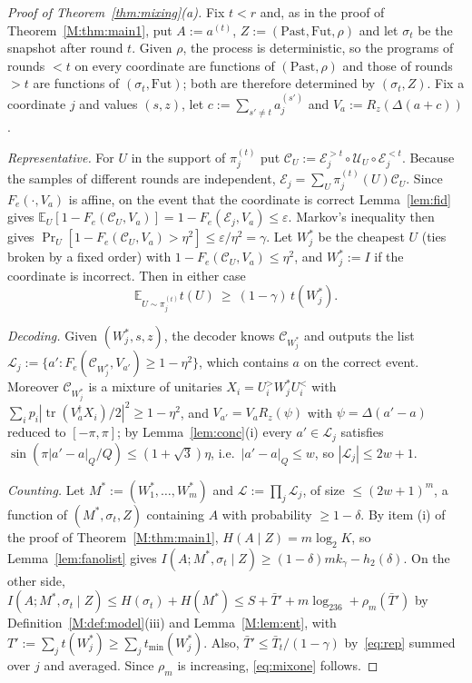 \documentclass[aps,prx,twocolumn,superscriptaddress,nofootinbib,longbibliography]{revtex4-2}
\theoremstyle{plain}
\theoremstyle{definition}
\theoremstyle{remark}
\newcommand{\E}{\mathbb{E}}
\newcommand{\tr}{\operatorname{tr}}
\begin{document}
\begin{proof}[Proof of Theorem~\ref{thm:mixing}(a)]
Fix $t<r$ and, as in the proof of Theorem~\ref{M:thm:main1}, put $A:=a^{(t)}$, $Z:=(\mathrm{Past},\mathrm{Fut},\rho)$ and let $\sigma_t$ be the snapshot after round $t$. Given $\rho$, the process is deterministic, so the programs of rounds $<t$ on every coordinate are functions of $(\mathrm{Past},\rho)$ and those of rounds $>t$ are functions of $(\sigma_t,\mathrm{Fut})$; both are therefore determined by $(\sigma_t,Z)$. Fix a coordinate $j$ and values $(s,z)$, let $c:=\sum_{s'\ne t}a^{(s')}_j$ and $V_a:=R_z(\Delta(a+c))$.

\emph{Representative.} For $U$ in the support of $\pi^{(t)}_j$ put $\mathcal C_U:=\mathcal E^{>t}_j\circ\mathcal U_U\circ\mathcal E^{<t}_j$. Because the samples of different rounds are independent, $\mathcal E_j=\sum_U\pi^{(t)}_j(U)\mathcal C_U$. Since $F_e(\cdot,V_a)$ is affine, on the event that the coordinate is correct Lemma~\ref{lem:fid} gives $\E_U[1-F_e(\mathcal C_U,V_a)]=1-F_e(\mathcal E_j,V_a)\le\varepsilon$. Markov's inequality then gives $\Pr_U[1-F_e(\mathcal C_U,V_a)>\eta^2]\le\varepsilon/\eta^2=\gamma$. Let $W^*_j$ be the cheapest $U$ (ties broken by a fixed order) with $1-F_e(\mathcal C_U,V_a)\le\eta^2$, and $W^*_j:=I$ if the coordinate is incorrect. Then in either case
\begin{equation}\label{eq:rep}
\E_{U\sim\pi^{(t)}_j}t(U)\ \ge\ (1-\gamma)\,t(W^*_j).
\end{equation}

\emph{Decoding.} Given $(W^*_j,s,z)$, the decoder knows $\mathcal C_{W^*_j}$ and outputs the list $\mathcal L_j:=\{a':F_e(\mathcal C_{W^*_j},V_{a'})\ge1-\eta^2\}$, which contains $a$ on the correct event. Moreover $\mathcal C_{W^*_j}$ is a mixture of unitaries $X_i=U^>_iW^*_jU^<_i$ with $\sum_ip_i|\tr(V_a^\dagger X_i)/2|^2\ge1-\eta^2$, and $V_{a'}=V_aR_z(\psi)$ with $\psi=\Delta(a'-a)$ reduced to $[-\pi,\pi]$; by Lemma~\ref{lem:conc}(i) every $a'\in\mathcal L_j$ satisfies $\sin(\pi|a'-a|_Q/Q)\le(1+\sqrt3)\eta$, i.e.\ $|a'-a|_Q\le w$, so $|\mathcal L_j|\le2w+1$.

\emph{Counting.} Let $M^*:=(W^*_1,\dots,W^*_m)$ and $\mathcal L:=\prod_j\mathcal L_j$, of size $\le(2w+1)^m$, a function of $(M^*,\sigma_t,Z)$ containing $A$ with probability $\ge1-\delta$. By item (i) of the proof of Theorem~\ref{M:thm:main1}, $H(A\mid Z)=m\log_2K$, so Lemma~\ref{lem:fanolist} gives $I(A;M^*,\sigma_t\mid Z)\ge(1-\delta)mk_\gamma-h_2(\delta)$. On the other side, $I(A;M^*,\sigma_t\mid Z)\le H(\sigma_t)+H(M^*)\le S+\bar T'+m\log_236+\rho_m(\bar T')$ by Definition~\ref{M:def:model}(iii) and Lemma~\ref{M:lem:ent}, with $T':=\sum_jt(W^*_j)\ge\sum_jt_{\min}(W^*_j)$. Also, $\bar T'\le\bar T_t/(1-\gamma)$ by~\eqref{eq:rep} summed over $j$ and averaged. Since $\rho_m$ is increasing, \eqref{eq:mixone} follows.
\end{proof}
\end{document}
